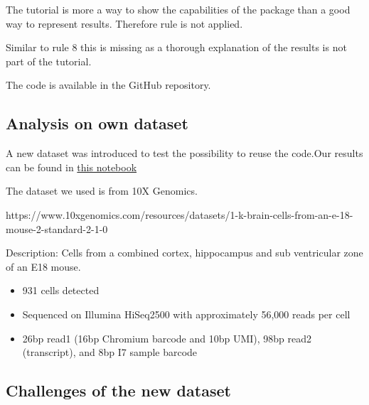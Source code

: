 \documentclass[a4paper, 10pt]{scrartcl}
\providecommand{\tightlist}{%
  \setlength{\itemsep}{0pt}\setlength{\parskip}{0pt}}
\begin{document}
The tutorial is more a way to show the capabilities of the package than
a good way to represent results. Therefore rule is not applied.

\hypertarget{rule-9-connect-textual-statements-to-underlying-results}{%
\label{rule-9-connect-textual-statements-to-underlying-results}}

Similar to rule 8 this is missing as a thorough explanation of the
results is not part of the tutorial.

\hypertarget{rule-10-provide-public-access-to-scripts-runs-and-results}{%
\label{rule-10-provide-public-access-to-scripts-runs-and-results}}

The code is available in the GitHub repository.

\hypertarget{analysis-on-own-dataset}{%
\subsection{Analysis on own dataset}\label{analysis-on-own-dataset}}

A new dataset was introduced to test the possibility to reuse the
code.Our results can be found in
\href{https://github.com/gschloegel/Course_Fallstudie_scRNA-Seq-with-Seurat/blob/main/scripts/new_dataset_neurons_900.md}{this
notebook}

The dataset we used is from 10X Genomics.

https://www.10xgenomics.com/resources/datasets/1-k-brain-cells-from-an-e-18-mouse-2-standard-2-1-0

Description: Cells from a combined cortex, hippocampus and sub
ventricular zone of an E18 mouse.

\begin{itemize}
\tightlist
\item
  931 cells detected
\item
  Sequenced on Illumina HiSeq2500 with approximately 56,000 reads per
  cell
\item
  26bp read1 (16bp Chromium barcode and 10bp UMI), 98bp read2
  (transcript), and 8bp I7 sample barcode
\end{itemize}

\hypertarget{challenges-of-the-new-dataset}{%
\subsection{Challenges of the new
dataset}\label{challenges-of-the-new-dataset}}
\end{document}
